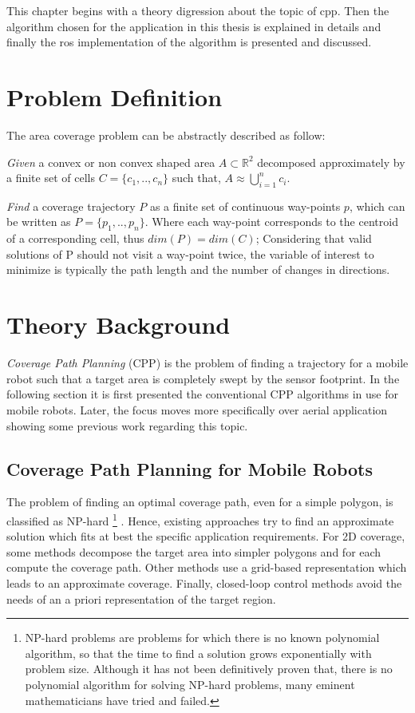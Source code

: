 This chapter begins with a theory digression about the topic of \acrlong{cpp}. Then the algorithm chosen for the application in this thesis is explained in details and finally the \acrshort{ros} implementation of the algorithm is presented and discussed.
\section{Problem Definition} %
\label{sec:problem_definition}
The area coverage problem can be abstractly described as follow:\par 
\textit{Given} a convex or non convex shaped area $A \subset \mathbb{R}^2$ decomposed approximately by a finite set of cells $C = \{c_1, .., c_n\}$ such that, $A \approx \bigcup_{i=1}^{n} c_i$.\par
\textit{Find} a coverage trajectory $P$ as a finite set of continuous way-points $p$, which can be written as $P = \{p_1, .., p_n\}$. Where each way-point corresponds to the centroid of a corresponding cell, thus $dim(P) = dim(C)$;
Considering that valid solutions of P should not visit a way-point twice, the variable of interest to minimize is typically the path length and the number of changes in directions.
\section{Theory Background} %
\label{sec:theory_background}
\textit{Coverage Path Planning} (CPP) is the problem of finding a trajectory for a mobile robot such that a target area is completely swept by the sensor footprint. In the following section it is first presented the conventional CPP algorithms in use for mobile robots. Later, the focus moves more specifically over aerial application showing some previous work regarding this topic.

\subsection{Coverage Path Planning for Mobile Robots} %
\label{sub:coverage_path_planning_for_mobile_robots}
The problem of finding an optimal coverage path, even for a simple polygon, is classified as NP-hard \footnote{NP-hard problems are problems for which there is no known polynomial algorithm, so that the time to find a solution grows exponentially with problem size. Although it has not been definitively proven that, there is no polynomial algorithm for solving NP-hard problems, many eminent mathematicians have tried and failed.} \cite{ARKIN200025}. Hence, existing approaches try to find an approximate solution which fits at best the specific application requirements. For 2D coverage, some methods decompose the target area into simpler polygons and for each compute the coverage path. Other methods use a grid-based representation which leads to an approximate coverage. Finally, closed-loop control methods avoid the needs of an a priori representation of the target region.

